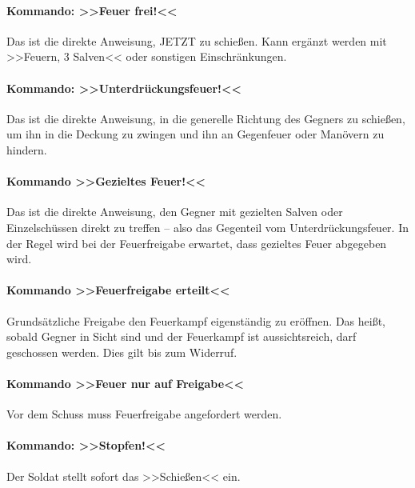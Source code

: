\paragraph*{Kommando: >>Feuer frei!<<}
	Das ist die direkte Anweisung, JETZT zu schießen. Kann ergänzt werden mit >>Feuern, 3 Salven<< oder sonstigen Einschränkungen.

\paragraph*{Kommando: >>Unterdrückungsfeuer!<<}
	Das ist die direkte Anweisung, in die generelle Richtung des Gegners zu schießen, um ihn in die Deckung zu zwingen und ihn an Gegenfeuer oder Manövern zu hindern.

\paragraph*{Kommando >>Gezieltes Feuer!<<}
	Das ist die direkte Anweisung, den Gegner mit gezielten Salven oder Einzelschüssen direkt zu treffen -- also das Gegenteil vom Unterdrückungsfeuer. In der Regel wird bei der Feuerfreigabe erwartet, dass gezieltes Feuer abgegeben wird.

\paragraph*{Kommando >>Feuerfreigabe erteilt<<}
	Grundsätzliche Freigabe den Feuerkampf eigenständig zu eröffnen. Das heißt, sobald Gegner in Sicht sind und der Feuerkampf ist aussichtsreich, darf geschossen werden. Dies gilt bis zum Widerruf.

\paragraph*{Kommando >>Feuer nur auf Freigabe<<}
	Vor dem Schuss muss Feuerfreigabe angefordert werden.

\paragraph*{Kommando: >>Stopfen!<<}
	Der Soldat stellt sofort das >>Schießen<< ein.

